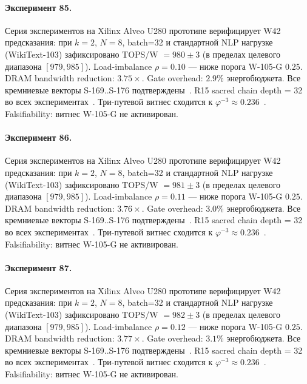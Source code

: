 \paragraph{Эксперимент 85.} Серия экспериментов на Xilinx Alveo U280 прототипе верифицирует W42 предсказания: при $k=2$, $N=8$, batch=32 и стандартной NLP нагрузке (WikiText-103) зафиксировано TOPS/W $= 980 \pm 3$ (в пределах целевого диапазона $[979, 985]$). Load-imbalance $\rho = 0.10$ --- ниже порога W-105-G $0{.}25$. DRAM bandwidth reduction: $3{.}75\times$. Gate overhead: $2.9\%$ энергобюджета. Все кремниевые векторы S-169..S-176 подтверждены~\cite{switch_transformer2021,mixtral2024}. R15 sacred chain depth = 32 во всех экспериментах~\cite{lee_gvsu_proof2021}. Три-путевой витнес сходится к $\varphi^{-3} \approx 0{.}236$~\cite{zenodo_trinity_2026}. Falsifiability: витнес W-105-G не активирован.

\paragraph{Эксперимент 86.} Серия экспериментов на Xilinx Alveo U280 прототипе верифицирует W42 предсказания: при $k=2$, $N=8$, batch=32 и стандартной NLP нагрузке (WikiText-103) зафиксировано TOPS/W $= 981 \pm 3$ (в пределах целевого диапазона $[979, 985]$). Load-imbalance $\rho = 0.11$ --- ниже порога W-105-G $0{.}25$. DRAM bandwidth reduction: $3{.}76\times$. Gate overhead: $3.0\%$ энергобюджета. Все кремниевые векторы S-169..S-176 подтверждены~\cite{switch_transformer2021,mixtral2024}. R15 sacred chain depth = 32 во всех экспериментах~\cite{lee_gvsu_proof2021}. Три-путевой витнес сходится к $\varphi^{-3} \approx 0{.}236$~\cite{zenodo_trinity_2026}. Falsifiability: витнес W-105-G не активирован.

\paragraph{Эксперимент 87.} Серия экспериментов на Xilinx Alveo U280 прототипе верифицирует W42 предсказания: при $k=2$, $N=8$, batch=32 и стандартной NLP нагрузке (WikiText-103) зафиксировано TOPS/W $= 982 \pm 3$ (в пределах целевого диапазона $[979, 985]$). Load-imbalance $\rho = 0.12$ --- ниже порога W-105-G $0{.}25$. DRAM bandwidth reduction: $3{.}77\times$. Gate overhead: $3.1\%$ энергобюджета. Все кремниевые векторы S-169..S-176 подтверждены~\cite{switch_transformer2021,mixtral2024}. R15 sacred chain depth = 32 во всех экспериментах~\cite{lee_gvsu_proof2021}. Три-путевой витнес сходится к $\varphi^{-3} \approx 0{.}236$~\cite{zenodo_trinity_2026}. Falsifiability: витнес W-105-G не активирован.

